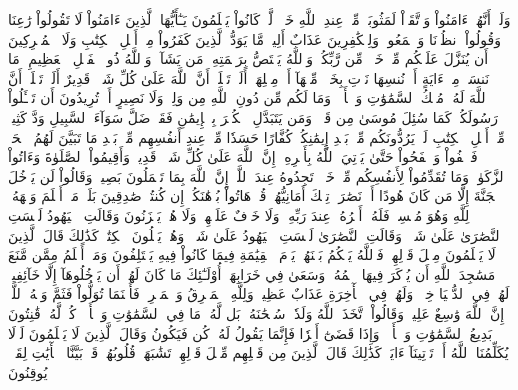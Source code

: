 وَلَوۡ أَنَّهُمۡ ءَامَنُواْ وَٱتَّقَوۡاْ لَمَثُوبَةٞ مِّنۡ عِندِ ٱللَّهِ خَيۡرٞۚ لَّوۡ كَانُواْ يَعۡلَمُونَ
يَـٰٓأَيُّهَا ٱلَّذِينَ ءَامَنُواْ لَا تَقُولُواْ رَٰعِنَا وَقُولُواْ ٱنظُرۡنَا وَٱسۡمَعُواْۗ وَلِلۡكَٰفِرِينَ عَذَابٌ أَلِيمٞ
مَّا يَوَدُّ ٱلَّذِينَ كَفَرُواْ مِنۡ أَهۡلِ ٱلۡكِتَٰبِ وَلَا ٱلۡمُشۡرِكِينَ أَن يُنَزَّلَ عَلَيۡكُم مِّنۡ خَيۡرٖ مِّن رَّبِّكُمۡۚ وَٱللَّهُ يَخۡتَصُّ بِرَحۡمَتِهِۦ مَن يَشَآءُۚ وَٱللَّهُ ذُو ٱلۡفَضۡلِ ٱلۡعَظِيمِ
۞مَا نَنسَخۡ مِنۡ ءَايَةٍ أَوۡ نُنسِهَا نَأۡتِ بِخَيۡرٖ مِّنۡهَآ أَوۡ مِثۡلِهَآۗ أَلَمۡ تَعۡلَمۡ أَنَّ ٱللَّهَ عَلَىٰ كُلِّ شَيۡءٖ قَدِيرٌ
أَلَمۡ تَعۡلَمۡ أَنَّ ٱللَّهَ لَهُۥ مُلۡكُ ٱلسَّمَٰوَٰتِ وَٱلۡأَرۡضِۗ وَمَا لَكُم مِّن دُونِ ٱللَّهِ مِن وَلِيّٖ وَلَا نَصِيرٍ
أَمۡ تُرِيدُونَ أَن تَسۡـَٔلُواْ رَسُولَكُمۡ كَمَا سُئِلَ مُوسَىٰ مِن قَبۡلُۗ وَمَن يَتَبَدَّلِ ٱلۡكُفۡرَ بِٱلۡإِيمَٰنِ فَقَدۡ ضَلَّ سَوَآءَ ٱلسَّبِيلِ
وَدَّ كَثِيرٞ مِّنۡ أَهۡلِ ٱلۡكِتَٰبِ لَوۡ يَرُدُّونَكُم مِّنۢ بَعۡدِ إِيمَٰنِكُمۡ كُفَّارًا حَسَدٗا مِّنۡ عِندِ أَنفُسِهِم مِّنۢ بَعۡدِ مَا تَبَيَّنَ لَهُمُ ٱلۡحَقُّۖ فَٱعۡفُواْ وَٱصۡفَحُواْ حَتَّىٰ يَأۡتِيَ ٱللَّهُ بِأَمۡرِهِۦٓۗ إِنَّ ٱللَّهَ عَلَىٰ كُلِّ شَيۡءٖ قَدِيرٞ
وَأَقِيمُواْ ٱلصَّلَوٰةَ وَءَاتُواْ ٱلزَّكَوٰةَۚ وَمَا تُقَدِّمُواْ لِأَنفُسِكُم مِّنۡ خَيۡرٖ تَجِدُوهُ عِندَ ٱللَّهِۗ إِنَّ ٱللَّهَ بِمَا تَعۡمَلُونَ بَصِيرٞ
وَقَالُواْ لَن يَدۡخُلَ ٱلۡجَنَّةَ إِلَّا مَن كَانَ هُودًا أَوۡ نَصَٰرَىٰۗ تِلۡكَ أَمَانِيُّهُمۡۗ قُلۡ هَاتُواْ بُرۡهَٰنَكُمۡ إِن كُنتُمۡ صَٰدِقِينَ
بَلَىٰۚ مَنۡ أَسۡلَمَ وَجۡهَهُۥ لِلَّهِ وَهُوَ مُحۡسِنٞ فَلَهُۥٓ أَجۡرُهُۥ عِندَ رَبِّهِۦ وَلَا خَوۡفٌ عَلَيۡهِمۡ وَلَا هُمۡ يَحۡزَنُونَ
وَقَالَتِ ٱلۡيَهُودُ لَيۡسَتِ ٱلنَّصَٰرَىٰ عَلَىٰ شَيۡءٖ وَقَالَتِ ٱلنَّصَٰرَىٰ لَيۡسَتِ ٱلۡيَهُودُ عَلَىٰ شَيۡءٖ وَهُمۡ يَتۡلُونَ ٱلۡكِتَٰبَۗ كَذَٰلِكَ قَالَ ٱلَّذِينَ لَا يَعۡلَمُونَ مِثۡلَ قَوۡلِهِمۡۚ فَٱللَّهُ يَحۡكُمُ بَيۡنَهُمۡ يَوۡمَ ٱلۡقِيَٰمَةِ فِيمَا كَانُواْ فِيهِ يَخۡتَلِفُونَ
وَمَنۡ أَظۡلَمُ مِمَّن مَّنَعَ مَسَٰجِدَ ٱللَّهِ أَن يُذۡكَرَ فِيهَا ٱسۡمُهُۥ وَسَعَىٰ فِي خَرَابِهَآۚ أُوْلَـٰٓئِكَ مَا كَانَ لَهُمۡ أَن يَدۡخُلُوهَآ إِلَّا خَآئِفِينَۚ لَهُمۡ فِي ٱلدُّنۡيَا خِزۡيٞ وَلَهُمۡ فِي ٱلۡأٓخِرَةِ عَذَابٌ عَظِيمٞ
وَلِلَّهِ ٱلۡمَشۡرِقُ وَٱلۡمَغۡرِبُۚ فَأَيۡنَمَا تُوَلُّواْ فَثَمَّ وَجۡهُ ٱللَّهِۚ إِنَّ ٱللَّهَ وَٰسِعٌ عَلِيمٞ
وَقَالُواْ ٱتَّخَذَ ٱللَّهُ وَلَدٗاۗ سُبۡحَٰنَهُۥۖ بَل لَّهُۥ مَا فِي ٱلسَّمَٰوَٰتِ وَٱلۡأَرۡضِۖ كُلّٞ لَّهُۥ قَٰنِتُونَ
بَدِيعُ ٱلسَّمَٰوَٰتِ وَٱلۡأَرۡضِۖ وَإِذَا قَضَىٰٓ أَمۡرٗا فَإِنَّمَا يَقُولُ لَهُۥ كُن فَيَكُونُ
وَقَالَ ٱلَّذِينَ لَا يَعۡلَمُونَ لَوۡلَا يُكَلِّمُنَا ٱللَّهُ أَوۡ تَأۡتِينَآ ءَايَةٞۗ كَذَٰلِكَ قَالَ ٱلَّذِينَ مِن قَبۡلِهِم مِّثۡلَ قَوۡلِهِمۡۘ تَشَٰبَهَتۡ قُلُوبُهُمۡۗ قَدۡ بَيَّنَّا ٱلۡأٓيَٰتِ لِقَوۡمٖ يُوقِنُونَ
